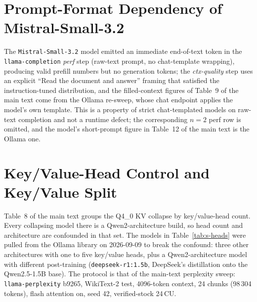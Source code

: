 \documentclass[11pt,a4paper]{article}
\begin{document}
\section{Prompt-Format Dependency of Mistral-Small-3.2}

The \texttt{Mistral-Small-3.2} model emitted an immediate end-of-text
token in the \texttt{llama-completion} \emph{perf} step (raw-text
prompt, no chat-template wrapping), producing valid prefill numbers
but no generation tokens; the \emph{ctx-quality} step uses an explicit
``Read the document and answer'' framing that satisfied the
instruction-tuned distribution, and the filled-context figures of
Table~9 of the main text come from the Ollama re-sweep, whose chat
endpoint applies the model's own template.  This is a property of
strict chat-templated models on raw-text completion and not a runtime
defect; the corresponding $n{=}2$ perf row is omitted, and the model's
short-prompt figure in Table~12 of the main text is the Ollama one.

\section{Key/Value-Head Control and Key/Value Split}

Table~8 of the main text groups the Q4\_0 KV collapse by key/value-head
count.  Every collapsing model there is a Qwen2-architecture build, so
head count and architecture are confounded in that set.  The models in
Table~\ref{tab:s-heads} were pulled from the Ollama library on
2026-09-09 to break the confound: three other architectures with one to
five key/value heads, plus a Qwen2-architecture model with different
post-training (\texttt{deepseek-r1:1.5b}, DeepSeek's distillation onto
the Qwen2.5-1.5B base).  The protocol is that of the main-text
perplexity sweep: \texttt{llama-perplexity} b9265, WikiText-2 test,
4096-token context, 24 chunks (98\,304 tokens), flash attention on,
seed 42, verified-stock 24\,CU.
\end{document}
